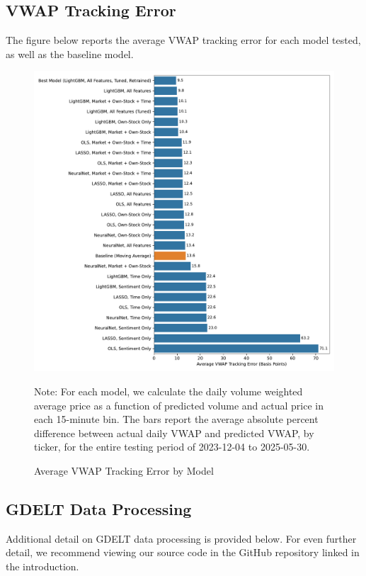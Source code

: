 \documentclass[12pt]{article}
\begin{document}
\subsection{VWAP Tracking Error}
The figure below reports the average VWAP tracking error for each model tested, as well as the baseline model.
\begin{figure}[H]
    \centering
    \caption{Average VWAP Tracking Error by Model}
    \includegraphics[width=\linewidth]{../Output/vwap_compare_all_models.pdf}
    \begin{minipage}{0.9\linewidth}
        \footnotesize
        \singlespacing
        Note: For each model, we calculate the daily volume weighted average price as a function of predicted volume and actual price in each 15-minute bin. The bars report the average absolute percent difference between actual daily VWAP and predicted VWAP, by ticker, for the entire testing period of 2023-12-04 to 2025-05-30.
    \end{minipage}
    \label{fig:vwap_tracking_error_all}
\end{figure}

\subsection{GDELT Data Processing}
\label{section:gdelt_details}
Additional detail on GDELT data processing is provided below. For even further detail, we recommend viewing our source code in the GitHub repository linked in the introduction.
\end{document}
